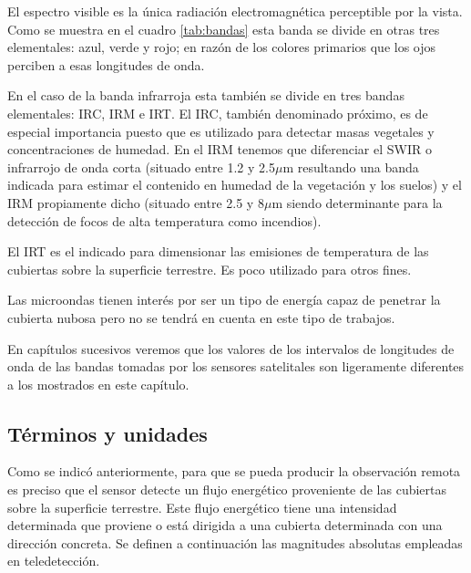 El espectro visible es la única radiación electromagnética perceptible por la vista. Como se muestra en el cuadro \ref{tab:bandas} esta banda se divide en otras tres elementales: azul, verde y rojo; en razón de los colores primarios que los ojos perciben a esas longitudes de onda.%

En el caso de la banda infrarroja esta también se divide en tres bandas elementales: \ac{IRC}, \ac{IRM} e \ac{IRT}. El \ac{IRC}, también denominado próximo, es de especial importancia puesto que es utilizado para detectar masas vegetales y concentraciones de humedad. En el \ac{IRM} tenemos que diferenciar el \ac{SWIR} o infrarrojo de onda corta (situado entre 1.2 y 2.5$\mu$m resultando una banda indicada para estimar el contenido en humedad de la vegetación y los suelos) y el \ac{IRM} propiamente dicho (situado entre 2.5 y 8$\mu$m siendo determinante para la detección de focos de alta temperatura como incendios).%

El \ac{IRT} es el indicado para dimensionar las emisiones de temperatura de las cubiertas sobre la superficie terrestre. Es poco utilizado para otros fines.%

Las microondas tienen interés por ser un tipo de energía capaz de penetrar la cubierta nubosa pero no se tendrá en cuenta en este tipo de trabajos.%

En capítulos sucesivos veremos que los valores de los intervalos de longitudes de onda de las bandas tomadas por los sensores satelitales son ligeramente diferentes a los mostrados en este capítulo.

\subsection{Términos y unidades}
Como se indicó anteriormente, para que se pueda producir la observación remota es preciso que el sensor detecte un flujo energético proveniente de las cubiertas sobre la superficie terrestre. Este flujo energético tiene una intensidad determinada que proviene o está dirigida a una cubierta determinada con una dirección concreta. Se definen a continuación las magnitudes absolutas empleadas en teledetección.

